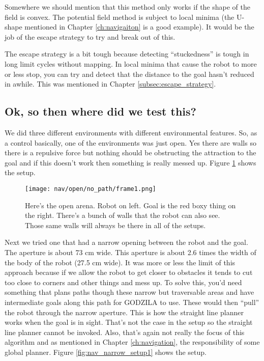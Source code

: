 Somewhere we should mention that this method only works if the shape of the field is
convex. The potential field method is subject to local minima (the U-shape mentioned in Chapter
\ref{ch:navigaiton} is a good example). It would be the job of the escape strategy to
try and break out of this.

The escape strategy is a bit tough because detecting ``stuckedness'' is tough in long
limit cycles without mapping.
In local minima that cause the robot to more or less stop, you can try and detect that
the distance to the goal hasn't reduced in awhile.
This was mentioned in Chapter \ref{subsec:escape_strategy}.

\subsection{Ok, so then where did we test this?}
We did three different environments with different environmental features.
So, as a control basically, one of the environments was just open. Yes there are walls
so there is a repulsive force but nothing should be obstructing the attraction to the
goal and if this doesn't work then something is really messed up. Figure \ref{fig:nav_open_setup1}
shows the setup.

\begin{figure}
  \texttt{[image: nav/open/no\_path/frame1.png]}
  \caption{Here's the open arena. Robot on left. Goal is the red boxy thing on the right.
           There's a bunch of walls that the robot can also see. Those same walls will
           always be there in all of the setups.}
  \label{fig:nav_open_setup1}
\end{figure}

Next we tried one that had a narrow opening between the robot and the goal.
The aperture is about 73 cm wide.
This aperture is about 2.6 times the width of the body of the robot (27.5 cm wide).
It was more or less the
limit of this approach because if we allow the robot to get closer to obstacles it tends
to cut too close to corners and other things and mess up.
To solve this, you'd need something that plans paths though these narrow but traversable
areas and have intermediate goals along this path for GODZILA to use.
These would then ``pull'' the robot through the narrow aperture.
This is how the straight line planner works when the goal is in sight.
That's not the case in the setup so the straight line planner cannot be invoked.
Also, that's again not really the focus of this algorithm and as mentioned in
Chapter \ref{ch:navigation}, the responsibility of some global planner.
Figure \ref{fig:nav_narrow_setup1} shows the setup.

